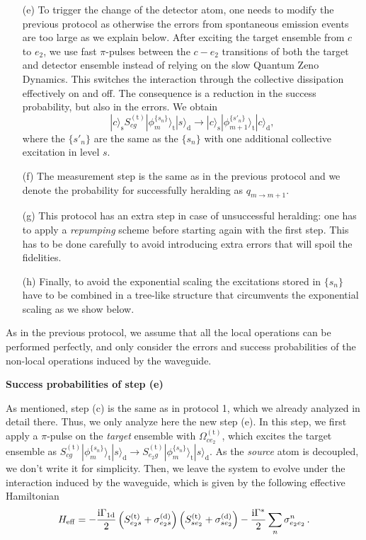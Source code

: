 \documentclass[twocolumn,pra,aps,superscriptaddress,showpacs]{revtex4-1}
\newcommand{\ket}[1]{|#1\rangle}
\def\oned{\mathrm{1d}}
\newcommand{\trg}{\mathrm{(t)}}
\newcommand{\dtc}{\mathrm{(d)}}
\def\ii{\mathord{\rm i}}
\newcommand{\rs}{\mathrm{s}}
\newcommand{\rd}{\mathrm{d}}
\newcommand{\rt}{\mathrm{t}}
\begin{document}
\begin{enumerate}
	\item [(e)] To trigger the change of the detector atom, one needs to modify the previous protocol as otherwise the errors from spontaneous emission events are too large as we explain below. After exciting the target ensemble from $c$ to $e_2$, we use fast $\pi$-pulses between the $c - e_2$ transitions of both the target and detector ensemble instead of relying on the slow Quantum Zeno Dynamics. This switches the interaction through the collective dissipation effectively on and off. The consequence is a reduction in the success probability, but also in the errors. We obtain
	\begin{equation}
	\ket{c}_\rs S_{c g}^{(\rt)}\ket{\phi_m^{ \{ s_n\}}}_\rt \ket{s}_\rd
	\rightarrow
	\ket{c}_\rs \ket{\phi_{m+1}^{ \{ s'_n\}} }_\rt \ket{c}_\rd,
	\end{equation}
	where the $\{ s'_n\}$ are the same as the $\{ s_n\}$ with one additional collective excitation in level $s$.
	
	\item [(f)] The measurement step is the same as in the previous protocol and we denote the probability for successfully heralding as $q_{m \rightarrow m+1}$.
	
	\item [(g)] This protocol has an extra step in case of unsuccessful heralding: one has to apply a \emph{repumping} scheme before starting again with the first step. This has to be done carefully to avoid introducing extra errors that will spoil the fidelities.
	
	\item [(h)] Finally, to avoid the exponential scaling the excitations stored in $\{s_n\}$ have to be combined in a tree-like structure that circumvents the exponential scaling as we show below.
\end{enumerate}

As in the previous protocol, we assume that all the local operations can be performed perfectly, and only consider the errors and success probabilities of the non-local operations induced by the waveguide.

\textbf{Success probabilities of step (e)}

As mentioned, step (c) is the same as in protocol 1, which we already analyzed in detail there. Thus, we only analyze here the new step (e). In this step, we first apply a $\pi$-pulse on the \emph{target} ensemble with $\Omega_{ce_2}^\trg$, which excites the target ensemble as $S_{c g}^{(\rt)}\ket{\phi_m^{ \{ s_n\}}}_\rt \ket{s}_\rd\rightarrow S_{e_2 g}^{(\rt)}\ket{\phi_m^{ \{ s_n\}}}_\rt \ket{s}_\rd$. As the \emph{source} atom is decoupled, we don't write it for simplicity. Then, we leave the system to evolve under the interaction induced by the waveguide, which is given by the following effective Hamiltonian
\begin{equation}\label{eq:Heff2}
H_{\mathrm{eff}}
	= - \frac{\ii\Gamma_\oned}{2} \left(S_{e_2 s}^\trg+\sigma_{e_2 s}^\dtc \right)\left(S_{s e_2}^\trg +\sigma_{s e_2}^\dtc \right)  - \frac{\ii\Gamma^*}{2} \sum_{n}\sigma_{e_2 e_2}^n\,.
\end{equation}
\end{document}
